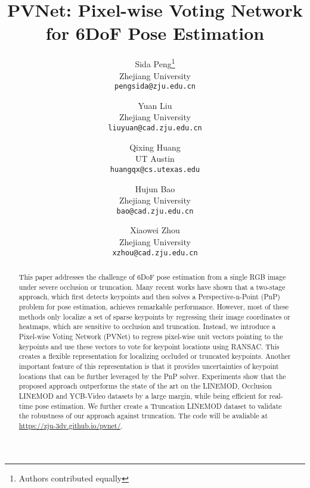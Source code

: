 \documentclass[10pt,twocolumn,letterpaper]{article}
\begin{document}
\title{PVNet: Pixel-wise Voting Network for 6DoF Pose Estimation}

\author{
Sida Peng\thanks{Authors contributed equally}\\
Zhejiang University\\
{\tt\small pengsida@zju.edu.cn}
\and
Yuan Liu\\
Zhejiang University\\
{\tt\small liuyuan@cad.zju.edu.cn}
\and
Qixing Huang\\
UT Austin\\
{\tt\small huangqx@cs.utexas.edu}
\and
Hujun Bao\\
Zhejiang University\\
{\tt\small bao@cad.zju.edu.cn}
\and
Xiaowei Zhou\\
Zhejiang University\\
{\tt\small xzhou@cad.zju.edu.cn}
}

\maketitle

\begin{abstract}
    This paper addresses the challenge of 6DoF pose estimation from a single RGB image under severe occlusion or truncation. Many recent works have shown that a two-stage approach, which first detects keypoints and then solves a Perspective-n-Point (PnP) problem for pose estimation, achieves remarkable performance. However, most of these methods only localize a set of sparse keypoints by regressing their image coordinates or heatmaps, which are sensitive to occlusion and truncation. Instead, we introduce a Pixel-wise Voting Network (PVNet) to regress pixel-wise unit vectors pointing to the keypoints and use these vectors to vote for keypoint locations using RANSAC. This creates a flexible representation for localizing occluded or truncated keypoints. Another important feature of this representation is that it provides uncertainties of keypoint locations that can be further leveraged by the PnP solver. Experiments show that the proposed approach outperforms the state of the art on the LINEMOD, Occlusion LINEMOD and YCB-Video datasets by a large margin, while being efficient for real-time pose estimation. We further create a Truncation LINEMOD dataset to validate the robustness of our approach against truncation. The code will be avaliable at \href{https://zju-3dv.github.io/pvnet/}{https://zju-3dv.github.io/pvnet/}.
\end{abstract}
\end{document}
